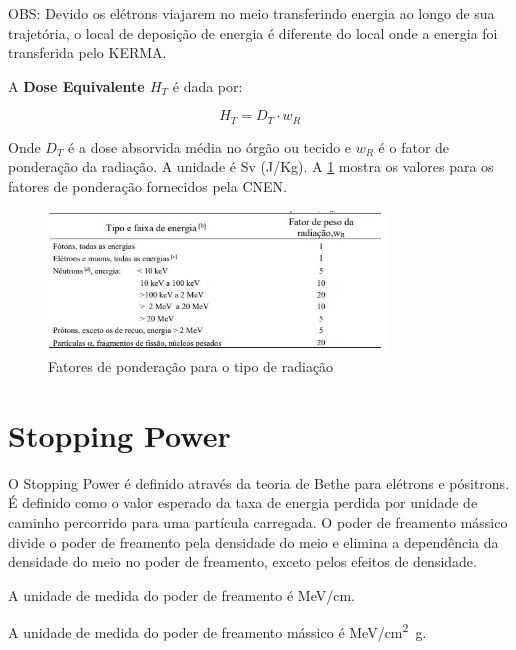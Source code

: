 \documentclass[11pt,a4paper]{article}
\newcounter{exemplo}
\begin{document}
		\textcolor{CarnationPink}{OBS:} Devido os elétrons viajarem no meio transferindo energia ao longo de sua trajetória, o local de deposição de energia é diferente do local onde a energia foi transferida pelo KERMA. 

		A \textbf{\textcolor{CarnationPink}{Dose Equivalente $H_T$}} é dada por:

		\begin{equation}
			H_T = D_T \cdot w_R
		\end{equation}

		Onde $D_T$ é a dose absorvida média no órgão ou tecido e $w_R$ é o fator de ponderação da radiação. A unidade é Sv (J/Kg). A   \ref{fig:fatorPesoRadiacao} mostra os valores para os fatores de ponderação fornecidos pela CNEN.

		\begin{figure}[h]
			\centering
			\includegraphics[width=0.8\textwidth]{Imagens/fatorPesoRadiacao.JPG}
			\caption{Fatores de ponderação para o tipo de radiação}
			\label{fig:fatorPesoRadiacao}
		\end{figure}


	\section{Stopping Power}

		O Stopping Power é definido através da teoria de Bethe para elétrons e pósitrons. É definido como o valor esperado da taxa de energia perdida por unidade de caminho percorrido para uma partícula carregada. O poder de freamento mássico divide o poder de freamento pela densidade do meio e elimina a dependência da densidade do meio no poder de freamento, exceto pelos efeitos de densidade. 

			\begin{exemplo}[Unidade]

				A unidade de medida do poder de freamento é \unit{MeV/cm}.

				A unidade de medida do poder de freamento mássico é \unit{MeV/cm^2g}.

			\end{exemplo}
\end{document}
